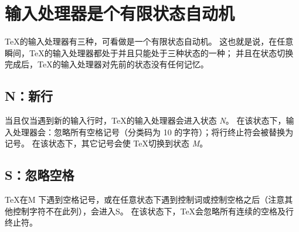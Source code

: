 \documentclass{book}
\begin{document}
\section{输入处理器是个有限状态自动机}
\label{input:states}

\TeX 的输入处理器有三种，可看做是一个有限状态自动机。
这也就是说，在任意瞬间，\TeX 的输入处理器都处于并且只能处于三种状态的一种；
并且在状态切换完成后，\TeX 的输入处理器对先前的状态没有任何记忆。

\subsection{\cstate N：新行}

当且仅当遇到新的输入行时，\TeX 的输入处理器会进入状态 {\itshape N}。
在该状态下，输入处理器会：忽略所有空格记号（分类码为 10 的字符）；将行终止符会被替换为  记号。
在该状态下，其它记号会使 \TeX 切换到状态 {\itshape M}。

\subsection{\cstate S：忽略空格}

\TeX 在\cstate M 下遇到空格记号，或在任意状态下遇到控制词或控制空格之后（注意其他控制字符不在此列），会进入\cstate S。
在该状态下，\TeX 会忽略所有连续的空格及行终止符。
\end{document}
